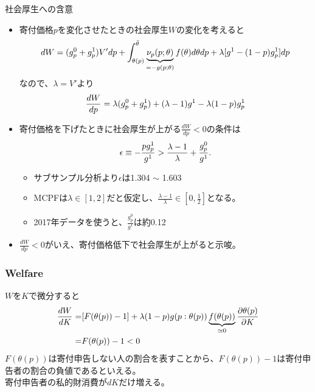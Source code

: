 \documentclass[dvipdfmx,10pt]{beamer}
\begin{document}
\begin{frame}{社会厚生への含意}
	\begin{itemize}
		\item 寄付価格$p$を変化させたときの社会厚生$W$の変化を考えると\begin{align}
			dW 
			=(g_p^0+g_p^1)V'dp+\int_{\theta(p)}^{\bar{\theta}}\underbrace{\nu_p(p;\theta)}_{=-g(p;\theta)}f(\theta)d\theta dp+\lambda[g^1-(1-p)g^1_p]dp\notag
		\end{align}
		なので、$\lambda=V'$より
		\begin{align}
			\frac{dW}{dp} =\lambda (g_p^0+g_p^1)+(\lambda-1)g^1-\lambda(1-p)g_p^1\notag
		\end{align}
		\item 寄付価格を下げたときに社会厚生が上がる$\frac{dW}{dp}<0$の条件は
		\begin{align}
			\epsilon\equiv -\frac{pg_p^1}{g^1}>\frac{\lambda-1}{\lambda}+\frac{g_p^0}{g^1}\notag.
		\end{align}
		\begin{itemize}
		\item サブサンプル分析より$\epsilon$は1.304 $\sim$ 1.603
		\item MCPFは$\lambda\in[1,2]$だと仮定し、$\frac{\lambda-1}{\lambda}\in[0,\frac12]$となる。
		\item 2017年データを使うと、$\frac{g_p^0}{g^1}$は約0.12
		\end{itemize}
		\item $\frac{dW}{dp}<0$がいえ、寄付価格低下で社会厚生が上がると示唆。
	\end{itemize}
\end{frame}

\begin{frame}
	\frametitle{Welfare}
	$W$を$K$で微分すると
	\begin{align}
		\frac{dW}{dK}=&[F(\theta(p))-1]+\lambda(1-p)g(p:\theta(p))\underbrace{f(\theta(p))}_{\simeq0}\frac{\partial \theta(p)}{\partial K}\notag\\
		=&F(\theta(p))-1<0\notag
	\end{align}
	$F(\theta(p))$は寄付申告しない人の割合を表すことから、$F(\theta(p))-1$は寄付申告者の割合の負値であるといえる。\\
	寄付申告者の私的財消費が$dK$だけ増える。
\end{frame}
\end{document}

